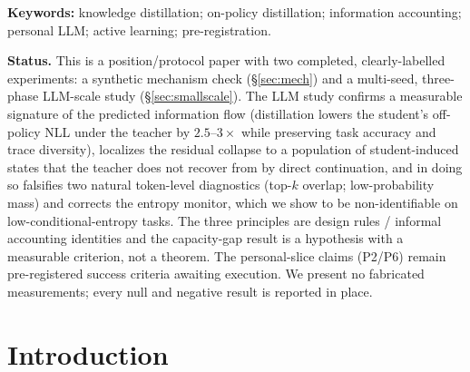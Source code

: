 \documentclass[11pt]{article}
\begin{document}
\begin{abstract}
token entropy is non-identifiable on low-conditional-entropy tasks), fixing state-recoverability endpoints (pass@$k$, trace diversity, recovery from corrupted and off-policy prefixes) and a recovery-aware training arm as the next testable stage (\S\ref{sec:future}). The personal-slice claims (P2/P6) remain pre-registered success criteria.
\end{abstract}

\noindent\textbf{Keywords:} knowledge distillation; on-policy distillation; information accounting; personal LLM; active learning; pre-registration.

\noindent\textbf{Status.} This is a position/protocol paper with two completed, clearly-labelled experiments: a synthetic mechanism check (\S\ref{sec:mech}) and a multi-seed, three-phase LLM-scale study (\S\ref{sec:smallscale}). The LLM study confirms a measurable signature of the predicted information flow (distillation lowers the student's off-policy NLL under the teacher by $2.5$--$3\times$ while preserving task accuracy and trace diversity), localizes the residual collapse to a population of student-induced states that the teacher does not recover from by direct continuation, and in doing so falsifies two natural token-level diagnostics (top-$k$ overlap; low-probability mass) and corrects the entropy monitor, which we show to be non-identifiable on low-conditional-entropy tasks. The three principles are design rules / informal accounting identities and the capacity-gap result is a hypothesis with a measurable criterion, not a theorem. The personal-slice claims (P2/P6) remain pre-registered success criteria awaiting execution. We present no fabricated measurements; every null and negative result is reported in place.

\section{Introduction}
\end{document}
